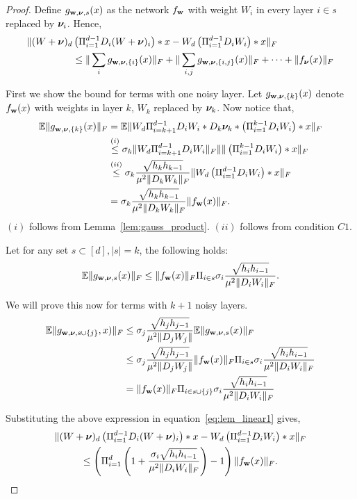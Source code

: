 \documentclass{article}
\begin{document}
\begin{proof}
Define $g_{\mathbf{w},\boldsymbol{\nu},s}(x)$ as the network $f_{\mathbf{w}}$ with weight $W_i$ in every layer $i\in s$ replaced by $\boldsymbol{\nu}_i$. Hence,
\begin{align}
 \| (W+\boldsymbol{\nu})_d &\left(\Pi_{i=1}^{d-1} D_{i}(W+\boldsymbol{\nu})_i \right)*x - W_d \left(\Pi_{i=1}^{d-1} D_{i}W_i \right)*x\|_F \nonumber \\
& \leq  \|\sum_i g_{\mathbf{w},\boldsymbol{\nu},\{i\}}(x)\|_F +\|\sum_{i,j} g_{\mathbf{w},\boldsymbol{\nu},\{i,j\}}(x)\|_F + \cdots + \| f_{\boldsymbol{\nu}}(x)\|_F  \label{eq:lem_linear1}
\end{align}

 First we show the bound for terms with one noisy layer. Let $g_{\mathbf{w},\boldsymbol{\nu},\{k\}}(x)$ denote $f_{\mathbf{w}}(x)$ with weights in layer $k$, $W_k$ replaced by $\boldsymbol{\nu}_k$. Now notice that,
\begin{align*}
\mathbb{E} \|g_{\mathbf{w},\boldsymbol{\nu},\{k\}}(x)\|_F &= \mathbb{E} \|W_d \Pi_{i=k+1}^{d-1} D_{i}W_i* D_k \boldsymbol{\nu}_k * \left(\Pi_{i=1}^{k-1} D_{i}W_i \right)*x \|_F \\
&\stackrel{(i)}{\leq}  \sigma_k   \|W_d \Pi_{i=k+1}^{d-1} D_{i}W_i\|_F  \|  \|\left(\Pi_{i=1}^{k-1} D_{i}W_i \right)*x \|_F \\
&\stackrel{(ii)}{\leq}  \sigma_k \frac{\sqrt{h_k h_{k-1}}}{\mu^2 \|D_k W_k\|_F} \|W_d \left(\Pi_{i=1}^{d-1} D_{i}W_i \right)*x \|_F \\
&=\sigma_k \frac{\sqrt{h_k h_{k-1} }}{\mu^2 \|D_k W_k\|_F} \| f_{\mathbf{w}}(x)\|_F.
\end{align*}
$(i)$ follows from Lemma~\ref{lem:gauss_product}. $(ii)$ follows from condition $C1$.

 Let for any set $s \subset [d], |s| =k$, the following holds:   $$\mathbb{E} \|g_{\mathbf{w},\boldsymbol{\nu},s}(x)\|_F \leq  \|f_{\mathbf{w}}(x)\|_F \Pi_{i \in s} \sigma_i \frac{\sqrt{h_i h_{i-1}}}{\mu^2\| D_i W_i\|_F} . $$

We will prove this now for terms with $k+1$ noisy layers. 
\begin{align*}
\mathbb{E} \|g_{\mathbf{w},\boldsymbol{\nu},s \cup \{j\}},x)\|_F &\leq  \sigma_j \frac{\sqrt{h_j h_{j-1}}}{\mu^2 \|D_j W_j\|} \mathbb{E} \|g_{\mathbf{w},\boldsymbol{\nu},s}(x)\|_F \\
&\leq  \sigma_j \frac{\sqrt{h_j h_{j-1}}}{\mu^2\|D_j W_j\|}    \|f_{\mathbf{w}}(x)\|_F \Pi_{i \in s} \sigma_i \frac{\sqrt{h_i h_{i-1}}}{\mu^2 \| D_i W_i\|_F} \\
&= \|f_{\mathbf{w}}(x)\|_F \Pi_{i \in s \cup \{j\}} \sigma_i \frac{\sqrt{h_i h_{i-1}}}{\mu^2 \| D_i W_i\|_F}
\end{align*}

Substituting the above expression in equation~\eqref{eq:lem_linear1} gives,
 \begin{multline*}
 \| (W+\boldsymbol{\nu})_d \left(\Pi_{i=1}^{d-1} D_{i}(W+\boldsymbol{\nu})_i \right)*x - W_d \left(\Pi_{i=1}^{d-1} D_{i}W_i \right)*x\|_F  \\ \leq  \left(\Pi_{i=1}^d \left(1+ \frac{\sigma_i \sqrt{h_ih_{i-1}}}{\mu^2 \|D_i W_i\|_F} \right) -1 \right)  \|f_{\mathbf{w}}(x)\|_F.
\end{multline*}

\end{proof}
\end{document}
